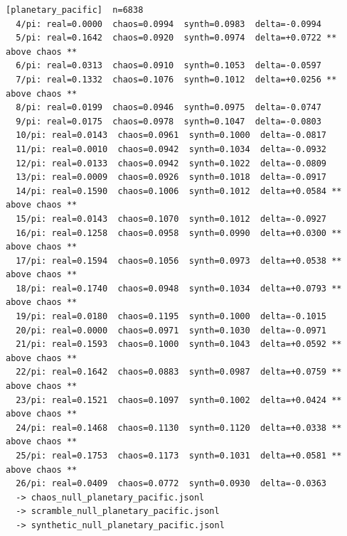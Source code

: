 \documentclass[11pt, letterpaper, openany]{book}
\begin{document}
\begin{empiricalbox}
\begin{lstlisting}[style=terminal]
[planetary_pacific]  n=6838
  4/pi: real=0.0000  chaos=0.0994  synth=0.0983  delta=-0.0994
  5/pi: real=0.1642  chaos=0.0920  synth=0.0974  delta=+0.0722 ** above chaos **
  6/pi: real=0.0313  chaos=0.0910  synth=0.1053  delta=-0.0597
  7/pi: real=0.1332  chaos=0.1076  synth=0.1012  delta=+0.0256 ** above chaos **
  8/pi: real=0.0199  chaos=0.0946  synth=0.0975  delta=-0.0747
  9/pi: real=0.0175  chaos=0.0978  synth=0.1047  delta=-0.0803
  10/pi: real=0.0143  chaos=0.0961  synth=0.1000  delta=-0.0817
  11/pi: real=0.0010  chaos=0.0942  synth=0.1034  delta=-0.0932
  12/pi: real=0.0133  chaos=0.0942  synth=0.1022  delta=-0.0809
  13/pi: real=0.0009  chaos=0.0926  synth=0.1018  delta=-0.0917
  14/pi: real=0.1590  chaos=0.1006  synth=0.1012  delta=+0.0584 ** above chaos **
  15/pi: real=0.0143  chaos=0.1070  synth=0.1012  delta=-0.0927
  16/pi: real=0.1258  chaos=0.0958  synth=0.0990  delta=+0.0300 ** above chaos **
  17/pi: real=0.1594  chaos=0.1056  synth=0.0973  delta=+0.0538 ** above chaos **
  18/pi: real=0.1740  chaos=0.0948  synth=0.1034  delta=+0.0793 ** above chaos **
  19/pi: real=0.0180  chaos=0.1195  synth=0.1000  delta=-0.1015
  20/pi: real=0.0000  chaos=0.0971  synth=0.1030  delta=-0.0971
  21/pi: real=0.1593  chaos=0.1000  synth=0.1043  delta=+0.0592 ** above chaos **
  22/pi: real=0.1642  chaos=0.0883  synth=0.0987  delta=+0.0759 ** above chaos **
  23/pi: real=0.1521  chaos=0.1097  synth=0.1002  delta=+0.0424 ** above chaos **
  24/pi: real=0.1468  chaos=0.1130  synth=0.1120  delta=+0.0338 ** above chaos **
  25/pi: real=0.1753  chaos=0.1173  synth=0.1031  delta=+0.0581 ** above chaos **
  26/pi: real=0.0409  chaos=0.0772  synth=0.0930  delta=-0.0363
  -> chaos_null_planetary_pacific.jsonl
  -> scramble_null_planetary_pacific.jsonl
  -> synthetic_null_planetary_pacific.jsonl


\end{lstlisting}
\end{empiricalbox}
\end{document}
